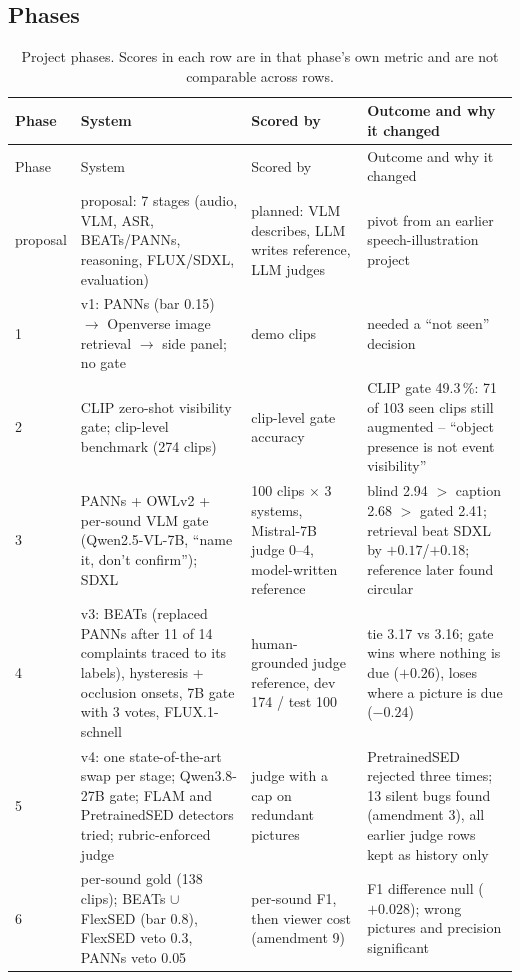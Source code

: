 \clearpage\subsection{Phases}
\begin{longtable}{L{1.7cm}L{4.2cm}L{3.6cm}L{5.2cm}}
\caption{Project phases. Scores in each row are in that phase's own metric and are not comparable across rows.}\label{tab:eras}\\
\toprule
Phase & System & Scored by & Outcome and why it changed \\
\midrule\endfirsthead
\toprule Phase & System & Scored by & Outcome and why it changed \\ \midrule\endhead
\bottomrule\endfoot
proposal & proposal: 7 stages (audio, VLM, ASR, BEATs/PANNs, reasoning, FLUX/SDXL, evaluation) & planned: VLM describes, LLM writes reference, LLM judges & pivot from an earlier speech-illustration project \\
1 & v1: PANNs (bar 0.15) $\to$ Openverse image retrieval $\to$ side panel; no gate & demo clips & needed a ``not seen'' decision \\
2 & CLIP zero-shot visibility gate; clip-level benchmark (274 clips) & clip-level gate accuracy & CLIP gate 49.3\,\%: 71 of 103 seen clips still augmented -- ``object presence is not event visibility'' \\
3 & PANNs + OWLv2 + per-sound VLM gate (Qwen2.5-VL-7B, ``name it, don't confirm''); SDXL & 100 clips $\times$ 3 systems, Mistral-7B judge 0--4, model-written reference & blind 2.94 $>$ caption 2.68 $>$ gated 2.41; retrieval beat SDXL by $+0.17$/$+0.18$; reference later found circular \\
4 & v3: BEATs (replaced PANNs after 11 of 14 complaints traced to its labels), hysteresis + occlusion onsets, 7B gate with 3 votes, FLUX.1-schnell & human-grounded judge reference, dev 174 / test 100 & tie 3.17 vs 3.16; gate wins where nothing is due ($+0.26$), loses where a picture is due ($-0.24$) \\
5 & v4: one state-of-the-art swap per stage; Qwen3.8-27B gate; FLAM and PretrainedSED detectors tried; rubric-enforced judge & judge with a cap on redundant pictures & PretrainedSED rejected three times; 13 silent bugs found (amendment 3), all earlier judge rows kept as history only \\
6 & per-sound gold (138 clips); BEATs $\cup$ FlexSED (bar 0.8), FlexSED veto 0.3, PANNs veto 0.05 & per-sound F1, then viewer cost (amendment 9) & F1 difference null ($+0.028$); wrong pictures and precision significant \\

\end{longtable}
